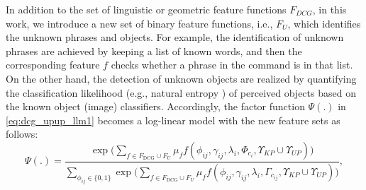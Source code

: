 In addition to the set of linguistic or geometric feature functions $F_{DCG}$, in this work, we introduce a new set of binary feature functions, i.e., $F_U$, which identifies the unknown phrases and objects. For example, the identification of unknown phrases are achieved by keeping a list of known words, and then the corresponding feature $f$ checks whether a phrase in the command is in that list. On the other hand, the detection of unknown objects are realized by quantifying the classification likelihood (e.g., natural entropy \cite{grimmett2013}) of perceived objects based on the known object (image) classifiers. Accordingly, the factor function $\Psi(.)$ in \eqref{eq:dcg_upup_llm1} becomes a log-linear model with the new feature sets as follows: %
\begin{equation}
\Psi(.) = \frac{\exp \Big( \sum\limits_{f \in F_{\text{DCG}} \cup F_U} \mu_f f(\phi_{ij},\gamma_{ij},\lambda_i,\Phi_{c_{i}},\Upsilon_{KP} \cup \Upsilon_{UP}) \Big)}{\sum\limits_{\phi_{ij} \in \{0,1\}}\exp \Big( \sum\limits_{f \in F_{\text{DCG}} \cup F_U} \mu_f f(\phi_{ij},\gamma_{ij},\lambda_i,\Gamma_{c_{ij}},\Upsilon_{KP} \cup \Upsilon_{UP}) \Big)},
\label{eq:dcg_upup_llm2}
\end{equation}
